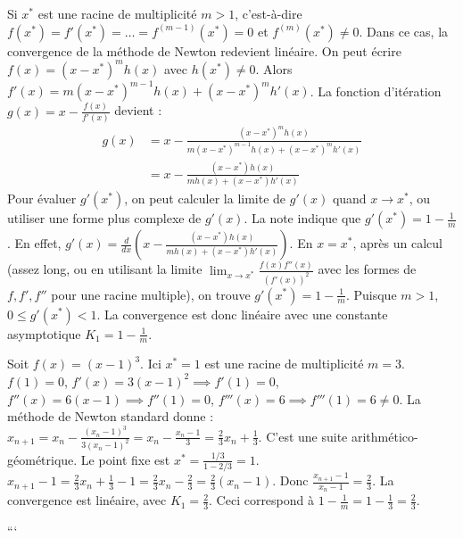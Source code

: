 \begin{remark}
Si $x^*$ est une racine de multiplicité $m > 1$, c'est-à-dire $f(x^*) = f'(x^*) = \dots = f^{(m-1)}(x^*) = 0$ et $f^{(m)}(x^*) \neq 0$.
Dans ce cas, la convergence de la méthode de Newton redevient linéaire.
On peut écrire $f(x) = (x-x^*)^m h(x)$ avec $h(x^*) \neq 0$.
Alors $f'(x) = m(x-x^*)^{m-1}h(x) + (x-x^*)^m h'(x)$.
La fonction d'itération $g(x) = x - \frac{f(x)}{f'(x)}$ devient :
\begin{align*}
g(x) &= x - \frac{(x-x^*)^m h(x)}{m(x-x^*)^{m-1}h(x) + (x-x^*)^m h'(x)} \\
&= x - \frac{(x-x^*)h(x)}{mh(x) + (x-x^*)h'(x)}
\end{align*}
Pour évaluer $g'(x^*)$, on peut calculer la limite de $g'(x)$ quand $x \to x^*$, ou utiliser une forme plus complexe de $g'(x)$.
La note indique que $g'(x^*) = 1 - \frac{1}{m}$.
En effet,
$g'(x) = \frac{d}{dx} \left( x - \frac{(x-x^*)h(x)}{mh(x) + (x-x^*)h'(x)} \right)$.
En $x=x^*$, après un calcul (assez long, ou en utilisant la limite $\lim_{x \to x^*} \frac{f(x)f''(x)}{(f'(x))^2}$ avec les formes de $f, f', f''$ pour une racine multiple), on trouve $g'(x^*) = 1 - \frac{1}{m}$.
Puisque $m > 1$, $0 \le g'(x^*) < 1$. La convergence est donc linéaire avec une constante asymptotique $K_1 = 1 - \frac{1}{m}$.

\begin{example}
Soit $f(x) = (x-1)^3$. Ici $x^*=1$ est une racine de multiplicité $m=3$.
$f(1)=0$, $f'(x)=3(x-1)^2 \implies f'(1)=0$, $f''(x)=6(x-1) \implies f''(1)=0$, $f'''(x)=6 \implies f'''(1)=6 \neq 0$.
La méthode de Newton standard donne :
$x_{n+1} = x_n - \frac{(x_n-1)^3}{3(x_n-1)^2} = x_n - \frac{x_n-1}{3} = \frac{2}{3}x_n + \frac{1}{3}$.
C'est une suite arithmético-géométrique. Le point fixe est $x^* = \frac{1/3}{1-2/3} = 1$.
$x_{n+1}-1 = \frac{2}{3}x_n + \frac{1}{3} - 1 = \frac{2}{3}x_n - \frac{2}{3} = \frac{2}{3}(x_n-1)$.
Donc $\frac{x_{n+1}-1}{x_n-1} = \frac{2}{3}$.
La convergence est linéaire, avec $K_1 = \frac{2}{3}$.
Ceci correspond à $1 - \frac{1}{m} = 1 - \frac{1}{3} = \frac{2}{3}$.
\end{example}
\end{remark}


```